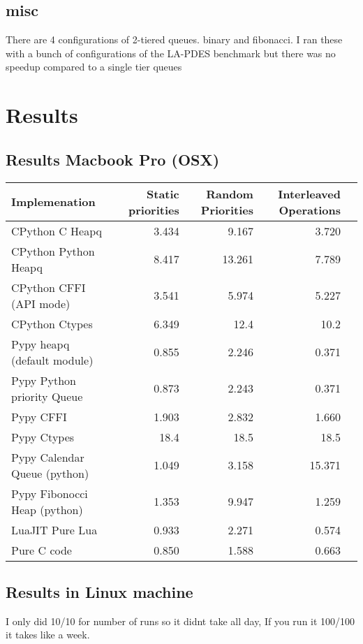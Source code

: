\documentclass[11pt]{article}
\begin{document}
\subsection{misc}
\label{sec-3-9}
There are 4 configurations of 2-tiered queues. binary and fibonacci. 
 I ran these with a bunch of configurations of the 
LA-PDES benchmark but there was no speedup compared to a single tier queues



\section{Results}
\label{sec-4}

\subsection{Results Macbook Pro (OSX)}
\label{sec-4-1}

\begin{center}
\begin{tabular}{lrrrl}
Implemenation & Static priorities & Random Priorities & Interleaved Operations & \\
\hline
CPython C Heapq & 3.434 & 9.167 & 3.720 & \\
CPython Python Heapq & 8.417 & 13.261 & 7.789 & \\
CPython CFFI (API mode) & 3.541 & 5.974 & 5.227 & \\
CPython Ctypes & 6.349 & 12.4 & 10.2 & \\
\hline
Pypy heapq (default module) & 0.855 & 2.246 & 0.371 & \\
Pypy Python priority Queue & 0.873 & 2.243 & 0.371 & \\
Pypy CFFI & 1.903 & 2.832 & 1.660 & \\
Pypy Ctypes & 18.4 & 18.5 & 18.5 & \\
Pypy Calendar Queue (python) & 1.049 & 3.158 & 15.371 & \\
Pypy Fibonocci Heap (python) & 1.353 & 9.947 & 1.259 & \\
\hline
LuaJIT Pure Lua & 0.933 & 2.271 & 0.574 & \\
Pure C code & 0.850 & 1.588 & 0.663 & \\
\hline
\end{tabular}
\end{center}


\subsection{Results in Linux machine}
\label{sec-4-2}
I only did 10/10 for number of runs so it didnt take all day, If you run it 100/100 it takes like a week.
\end{document}
